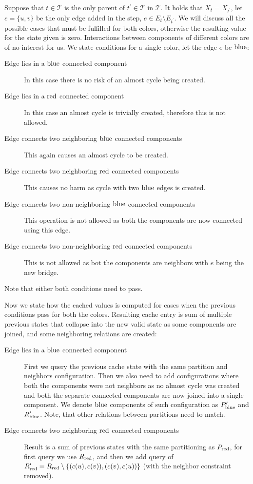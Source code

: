 Suppose that \( t \in \mathcal{T} \) is
the only parent of \( t^\prime \in \mathcal{T} \) in \( \mathcal {T} \).
It holds that \( X_t = X_{t^\prime} \),
let \( e = \{u, v\} \) be the only edge added in the step, \( e \in E_t \setminus E_{t^\prime} \).
We will discuss all the possible cases that must be fulfilled for both colors,
otherwise the resulting value for the state given is zero.
Interactions between components of different colors are of no interest for us.
We state conditions for a single color, \WLOG{} let the edge \( e \) be \( \text{blue} \):
%
\begin{description}
	\item[Edge lies in a \( \text{blue} \) connected component]
	      In this case there is no risk of an almost cycle being created.
	\item[Edge lies in a \( \text{red} \) connected component]
	      In this case an almost cycle is trivially created,
	      therefore this is not allowed.
	\item[Edge connects two neighboring \( \text{blue} \) connected components]
	      This again causes an almost cycle to be created.
	\item[Edge connects two neighboring \( \text{red} \) connected components]
	      This causes no harm as cycle with two \( \text{blue} \) edges is created.
	\item[Edge connects two non-neighboring \( \text{blue} \) connected components]
	      This operation is not allowed as both the components
	      are now connected using this edge.
	\item[Edge connects two non-neighboring \( \text{red} \) connected components]
	      This is not allowed as bot the components
	      are neighbors with \( e \) being the new bridge.
\end{description}
%
Note that either both conditions need to pass.

Now we state how the cached values is computed for cases when
the previous conditions pass for both the colors.
Resulting cache entry is sum of multiple previous states that
collapse into the new valid state as some components are joined,
and some neighboring relations are created:
%
\begin{description}
	\item[Edge lies in a \( \text{blue} \) connected component]
	      First we query the previous cache state with
	      the same partition and neighbors configuration.
	      Then we also need to add configurations where
	      both the components were not neighbors as no almost cycle was created
	      and both the separate connected components
	      are now joined into a single component.
	      We denote \( \text{blue} \) components of such configuration
	      as \( P_{\text{blue}}^\prime \) and \( R_{\text{blue}}^\prime \).
	      Note, that other relations between partitions need to match.
	\item[Edge connects two neighboring \( \text{red} \) connected components]
	      Result is a sum of previous states with the same partitioning as \( P_{\text{red}} \),
	      for first query we use \( R_{\text{red}} \),
	      and then we add query of \( R^\prime_{\text{red}} = R_{\text{red}} \setminus \{(c(u), c(v)), (c(v), c(u))\} \)
	      (with the neighbor constraint removed).
\end{description}
%

